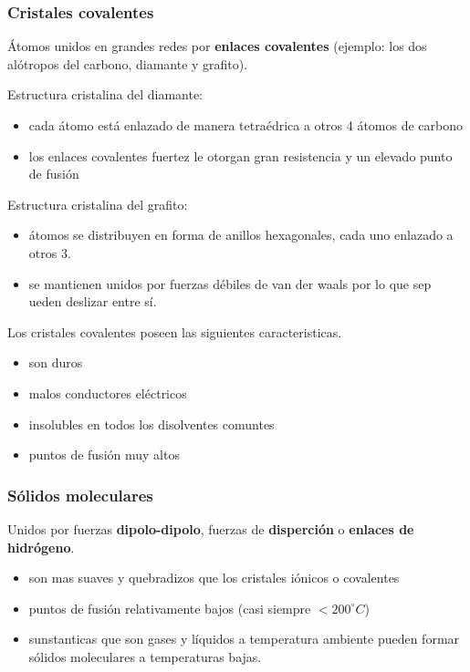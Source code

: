 \documentclass[]{article}
\begin{document}
\subsubsection{Cristales covalentes}
Átomos unidos en grandes redes por \textbf{enlaces covalentes} (ejemplo: los dos alótropos del carbono, diamante y grafito).

Estructura cristalina del diamante:

\begin{itemize}
	\item cada átomo está enlazado de manera tetraédrica a otros 4 átomos de carbono
	\item los enlaces covalentes fuertez le otorgan gran resistencia y un elevado punto de fusión
\end{itemize}

Estructura cristalina del grafito:

\begin{itemize}
	\item átomos se distribuyen en forma de anillos hexagonales, cada uno enlazado a otros 3.
	\item se mantienen unidos por fuerzas débiles de van der waals por lo que sep ueden deslizar entre sí.
\end{itemize}

Los cristales covalentes poseen las siguientes caracteristicas.

\begin{itemize}
	\item son duros
	\item malos conductores eléctricos
	\item insolubles en todos los disolventes comuntes
	\item puntos de fusión muy altos
\end{itemize}



\subsubsection{Sólidos moleculares}
Unidos por fuerzas \textbf{dipolo-dipolo}, fuerzas de \textbf{disperción} o \textbf{enlaces de hidrógeno}.

\begin{itemize}
	\item son mas suaves y quebradizos que los cristales iónicos o covalentes
	\item puntos de fusión relativamente bajos (casi siempre $<200^{\circ} C$)
	\item sunstanticas que son gases y líquidos a temperatura ambiente pueden formar sólidos moleculares a temperaturas bajas.
\end{itemize}
\end{document}
